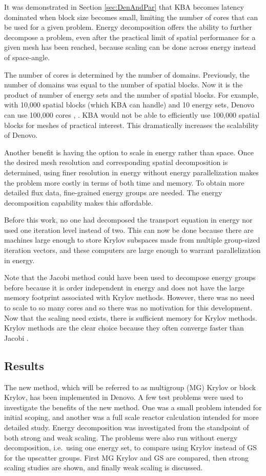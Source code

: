 It was demonstrated in Section \ref{sec:DenAndPar} that KBA becomes latency dominated when block size becomes small, limiting the number of cores that can be used for a given problem. Energy decomposition offers the ability to further decompose a problem, even after the practical limit of spatial performance for a given mesh has been reached, because scaling can be done across energy instead of space-angle. 

The number of cores is determined by the number of domains. Previously, the number of domains was equal to the number of spatial blocks. Now it is the product of number of energy sets and the number of spatial blocks. For example, with 10,000 spatial blocks (which KBA can handle) and 10 energy sets, Denovo can use 100,000 cores \cite{Evans2011}, \cite{Evans2010}. KBA would not be able to efficiently use 100,000 spatial blocks for meshes of practical interest. This dramatically increases the scalability of Denovo.

Another benefit is having the option to scale in energy rather than space. Once the desired mesh resolution and corresponding spatial decomposition is determined, using finer resolution in energy without energy parallelization makes the problem more costly in terms of both time and memory. To obtain more detailed flux data, fine-grained energy groups are needed. The energy decomposition capability makes this affordable. 

Before this work, no one had decomposed the transport equation in energy nor used one iteration level instead of two. This can now be done because there are machines large enough to store Krylov subspaces made from multiple group-sized iteration vectors, and these computers are large enough to warrant parallelization in energy. 

Note that the Jacobi method could have been used to decompose energy groups before because it is order independent in energy and does not have the large memory footprint associated with Krylov methods. However, there was no need to scale to so many cores and so there was no motivation for this development. Now that the scaling need exists, there is sufficient memory for Krylov methods. Krylov methods are the clear choice because they often converge faster than Jacobi \cite{LeVeque2007}. 

\subsection{Results}
The new method, which will be referred to as multigroup (MG) Krylov or block Krylov, has been implemented in Denovo. A few test problems were used to investigate the benefits of the new method. One was a small problem intended for initial scoping, and another was a full scale reactor calculation intended for more detailed study. Energy decomposition was investigated from the standpoint of both strong and weak scaling. The problems were also run without energy decomposition, i.e.\ using one energy set, to compare using Krylov instead of GS for the upscatter groups. First MG Krylov and GS are compared, then strong scaling studies are shown, and finally weak scaling is discussed.

